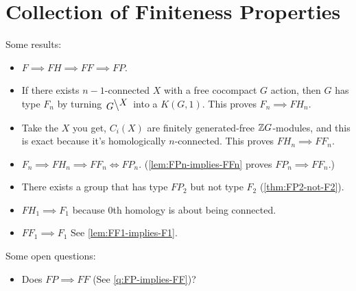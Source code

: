 \section{Collection of Finiteness Properties}
\label{sec:collection-of-types}



\TypeF*

\CohomologicalDim*

\TypeFFP*

\TypeFH*

Some results:
\begin{itemize}
    \item  \(F\implies FH \implies FF \implies FP\).
    
    \item If there exists \(n-1\)-connected \(X\) with a free cocompact \(G\) action, then \(G\) has type \(F_n\) by turning \(\leftQ{X }{G }\) into a \(K(G,1)\). This proves \(F_n \implies FH_n\).
    \item Take the \(X\) you get, \(C_i(X)\) are finitely generated-free \(\mathbb{Z} G\)-modules, and this is exact because it's homologically \(n\)-connected. This proves \(FH_n \implies FF_n\).
    \item  \(F_n \implies FH_n \implies FF_n \iff FP_n\). (\cref{lem:FPn-implies-FFn} proves \(FP_n \implies FF_n\).) 
    
    \item There exists a group that has type \(FP_2\) but not type \(F_2\) (\cref{thm:FP2-not-F2}). 
        
    \item \(FH_1 \implies F_1\) because \(0\)th homology is about being connected.
    \item \(FF_1 \implies F_1\) See \cref{lem:FF1-implies-F1}.
\end{itemize}


Some open questions:
\begin{itemize}
    \item Does \(FP \implies FF\) (See \cref{q:FP-implies-FF})?

\end{itemize}





